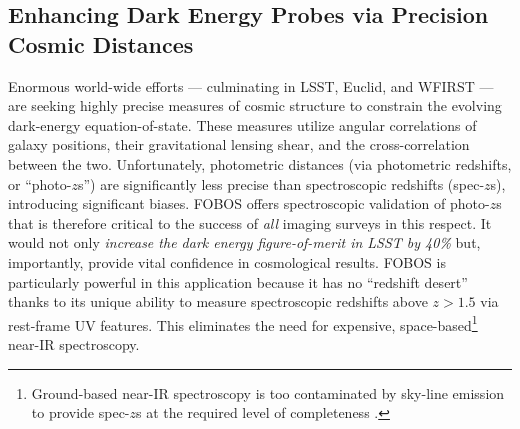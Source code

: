 
\subsection{Enhancing Dark Energy Probes via Precision Cosmic Distances}
\label{sec:cosmology}

Enormous world-wide efforts --- culminating in LSST, Euclid, and
WFIRST --- are seeking highly precise measures of cosmic structure to
constrain the evolving dark-energy equation-of-state. These measures
utilize angular correlations of galaxy positions, their gravitational
lensing shear, and the cross-correlation between the two.
Unfortunately, photometric distances (via photometric redshifts, or
``photo-$z$s'') are significantly less precise than spectroscopic
redshifts (spec-$z$s), introducing significant biases. FOBOS offers
spectroscopic validation of photo-$z$s that is therefore critical to
the success of {\it all} imaging surveys in this respect. It would
not only \emph{increase the dark energy figure-of-merit in LSST by
40\%} \citep{newman15} but, importantly, provide vital confidence in
cosmological results. FOBOS is particularly powerful in this
application because it has no ``redshift desert'' thanks to its
unique ability to measure spectroscopic redshifts above $z > 1.5$ via
rest-frame UV features. This eliminates the need for expensive,
space-based\footnote{Ground-based near-IR spectroscopy is too
contaminated by sky-line emission to provide spec-$z$s at the
required level of completeness \citep{newman15}.} near-IR
spectroscopy.

\noindent{}

\noindent{}